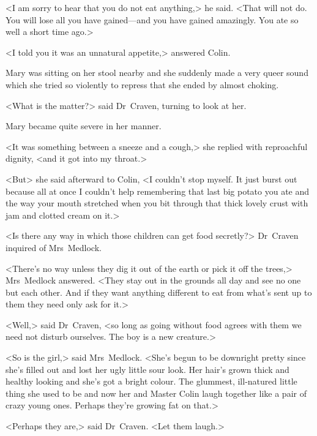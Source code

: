 <I am sorry to hear that you do not eat anything,> he said. <That will not do. You will lose all you have gained—and you have gained amazingly. You ate so well a short time ago.>

<I told you it was an unnatural appetite,> answered Colin.

Mary was sitting on her stool nearby and she suddenly made a very queer sound which she tried so violently to repress that she ended by almost choking.

<What is the matter?> said Dr~Craven, turning to look at her.

Mary became quite severe in her manner.

<It was something between a sneeze and a cough,> she replied with reproachful dignity, <and it got into my throat.>

<But> she said afterward to Colin, <I couldn't stop myself. It just burst out because all at once I couldn't help remembering that last big potato you ate and the way your mouth stretched when you bit through that thick lovely crust with jam and clotted cream on it.>

<Is there any way in which those children can get food secretly?> Dr~Craven inquired of Mrs~Medlock.

<There's no way unless they dig it out of the earth or pick it off the trees,> Mrs~Medlock answered. <They stay out in the grounds all day and see no one but each other. And if they want anything different to eat from what's sent up to them they need only ask for it.>

<Well,> said Dr~Craven, <so long as going without food agrees with them we need not disturb ourselves. The boy is a new creature.>

<So is the girl,> said Mrs~Medlock. <She's begun to be downright pretty since she's filled out and lost her ugly little sour look. Her hair's grown thick and healthy looking and she's got a bright colour. The glummest, ill-natured little thing she used to be and now her and Master Colin laugh together like a pair of crazy young ones. Perhaps they're growing fat on that.>

<Perhaps they are,> said Dr~Craven. <Let them laugh.>